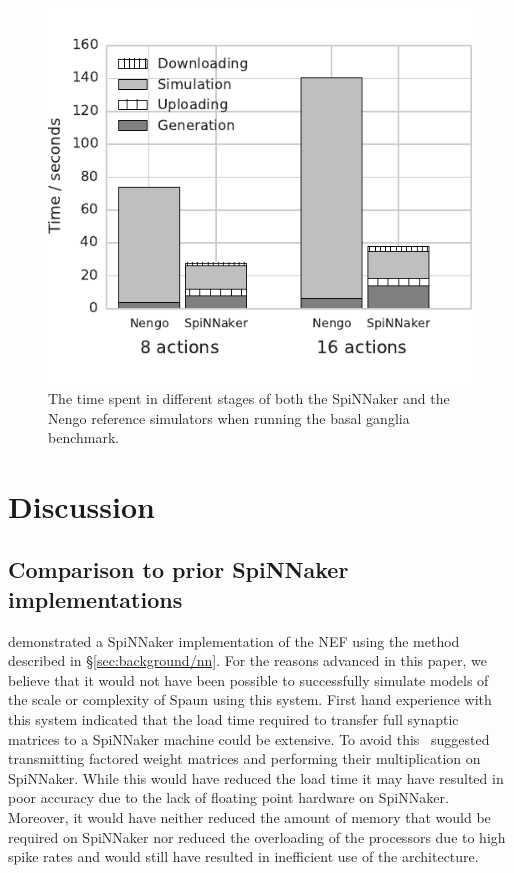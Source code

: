 \documentclass[conference]{IEEEtran}
\begin{document}
  \begin{figure}[!t]
    \includegraphics{figures/spa_wall_clock}
    \caption{The time spent in different stages of both the SpiNNaker and the Nengo reference simulators when running the basal ganglia benchmark. }
    \label{fig:results/spa-wall-clock}
  \end{figure}
  \section{Discussion}

  \subsection{Comparison to prior SpiNNaker implementations}

  \textcite{Galluppi2012} demonstrated a SpiNNaker implementation of the NEF using the method described in \S\ref{sec:background/nn}.
  For the reasons advanced in this paper, we believe that it would not have been possible to successfully simulate models of the scale or complexity of Spaun using this system.
  First hand experience with this system indicated that the load time required to transfer full synaptic matrices to a SpiNNaker machine could be extensive. 
To avoid this \citeauthor*{Galluppi2012}\ suggested transmitting factored weight matrices and performing their multiplication on SpiNNaker.
  While this would have reduced the load time it may have resulted in poor accuracy due to the lack of floating point hardware on SpiNNaker.
  Moreover, it would have neither reduced the amount of memory that would be required on SpiNNaker nor reduced the overloading of the processors due to high spike rates and would still have resulted in inefficient use of the architecture.
\end{document}
